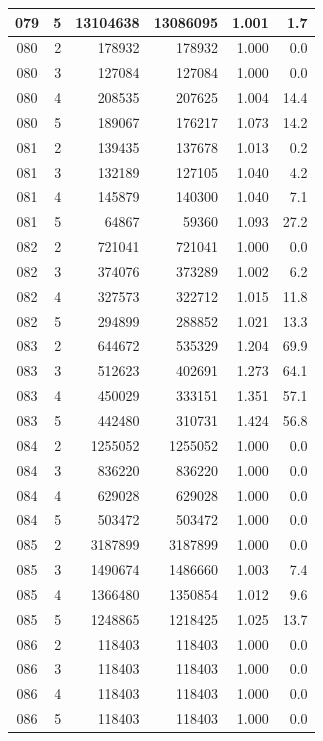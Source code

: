 \begin{longtable}{|c|r|r|r|r|r|}
\hline
079 & 5 & 13104638 & 13086095 & 1.001 & 1.7 \\
\hline
080 & 2 & 178932 & 178932 & 1.000 & 0.0 \\
\hline
080 & 3 & 127084 & 127084 & 1.000 & 0.0 \\
\hline
080 & 4 & 208535 & 207625 & 1.004 & 14.4 \\
\hline
080 & 5 & 189067 & 176217 & 1.073 & 14.2 \\
\hline
081 & 2 & 139435 & 137678 & 1.013 & 0.2 \\
\hline
081 & 3 & 132189 & 127105 & 1.040 & 4.2 \\
\hline
081 & 4 & 145879 & 140300 & 1.040 & 7.1 \\
\hline
081 & 5 & 64867 & 59360 & 1.093 & 27.2 \\
\hline
082 & 2 & 721041 & 721041 & 1.000 & 0.0 \\
\hline
082 & 3 & 374076 & 373289 & 1.002 & 6.2 \\
\hline
082 & 4 & 327573 & 322712 & 1.015 & 11.8 \\
\hline
082 & 5 & 294899 & 288852 & 1.021 & 13.3 \\
\hline
083 & 2 & 644672 & 535329 & 1.204 & 69.9 \\
\hline
083 & 3 & 512623 & 402691 & 1.273 & 64.1 \\
\hline
083 & 4 & 450029 & 333151 & 1.351 & 57.1 \\
\hline
083 & 5 & 442480 & 310731 & 1.424 & 56.8 \\
\hline
084 & 2 & 1255052 & 1255052 & 1.000 & 0.0 \\
\hline
084 & 3 & 836220 & 836220 & 1.000 & 0.0 \\
\hline
084 & 4 & 629028 & 629028 & 1.000 & 0.0 \\
\hline
084 & 5 & 503472 & 503472 & 1.000 & 0.0 \\
\hline
085 & 2 & 3187899 & 3187899 & 1.000 & 0.0 \\
\hline
085 & 3 & 1490674 & 1486660 & 1.003 & 7.4 \\
\hline
085 & 4 & 1366480 & 1350854 & 1.012 & 9.6 \\
\hline
085 & 5 & 1248865 & 1218425 & 1.025 & 13.7 \\
\hline
086 & 2 & 118403 & 118403 & 1.000 & 0.0 \\
\hline
086 & 3 & 118403 & 118403 & 1.000 & 0.0 \\
\hline
086 & 4 & 118403 & 118403 & 1.000 & 0.0 \\
\hline
086 & 5 & 118403 & 118403 & 1.000 & 0.0 \\

\end{longtable}
